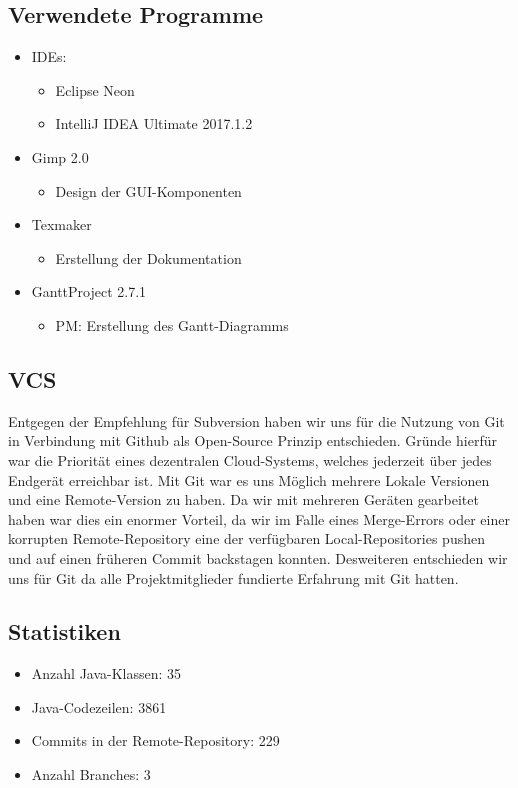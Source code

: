 \documentclass[12pt]{article}
\theoremstyle{plain}
\begin{document}
\subsection{Verwendete Programme}
\begin{itemize}
\item IDEs:
\begin{itemize}
\item Eclipse Neon
\item IntelliJ IDEA Ultimate 2017.1.2
\end{itemize}
\item Gimp 2.0
\begin{itemize}
\item Design der GUI-Komponenten
\end{itemize}
\item Texmaker
\begin{itemize}
\item Erstellung der Dokumentation
\end{itemize}
\item GanttProject 2.7.1
\begin{itemize}
\item PM: Erstellung des Gantt-Diagramms
\end{itemize}
\end{itemize}



\subsection{VCS}
Entgegen der Empfehlung für Subversion haben wir uns für die Nutzung von Git in Verbindung mit Github als Open-Source Prinzip entschieden. Gründe hierfür war die Priorität eines dezentralen Cloud-Systems, welches jederzeit über jedes Endgerät erreichbar ist. Mit Git war es uns Möglich mehrere Lokale Versionen und eine Remote-Version zu haben. Da wir mit mehreren Geräten gearbeitet haben war dies ein enormer Vorteil, da wir im Falle eines Merge-Errors oder einer korrupten Remote-Repository eine der verfügbaren Local-Repositories pushen und auf einen früheren Commit backstagen konnten. Desweiteren entschieden wir uns für Git da alle Projektmitglieder fundierte Erfahrung mit Git hatten.	
\subsection{Statistiken}
\begin{itemize}
\item Anzahl Java-Klassen: 35
\item Java-Codezeilen: 3861
\item Commits in der Remote-Repository: 229
\item Anzahl Branches: 3
\end{itemize}
\end{document}
